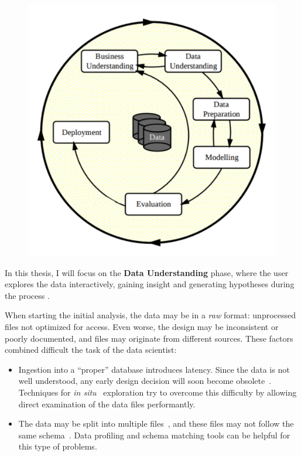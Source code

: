 \begin{figure}[htbp]
    \centering
    \includegraphics[width=0.8\linewidth]{images/1_introduction/crisp-dm.pdf}
    \caption{}
    \label{fig:crispdm}
\end{figure}

In this thesis, I will focus on the \textbf{Data Understanding} phase, where the user
explores the data interactively, gaining insight and generating hypotheses during the process \cite{Geer2014}.

When starting the initial analysis, the data may be in a \emph{raw} format: unprocessed files not
optimized for access. Even worse, the design may be inconsistent or poorly documented, and files may
originate from different sources. These factors combined difficult the task of the data scientist:

\begin{itemize}
    \item Ingestion into a ``proper'' database introduces latency. Since the data is not well
        understood, any early design decision will soon become obsolete~\cite{Kersten2011}.
        Techniques for \emph{in situ}~\cite{Idreos2011} exploration try to overcome this difficulty
        by allowing direct examination of the data files performantly.
    \item The data may be split into multiple files~\cite{Baud2012}, and these files may not
        follow the same schema~\cite{Alawini2014}. Data profiling and schema matching tools
        can be helpful for this type of problems.
\end{itemize}

